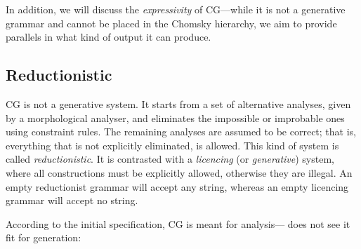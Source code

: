 In addition, we will discuss the \emph{expressivity} of CG---while it is not a generative grammar and cannot be placed in the Chomsky hierarchy, we aim to provide parallels in what kind of output it can produce.

\subsection{Reductionistic}\label{reductionist-vs.licencing}

CG is not a generative system.
It starts from a set of alternative analyses, given by a morphological analyser,
and eliminates the impossible or improbable ones using constraint rules. 
The remaining analyses are assumed to be correct; that
is, everything that is not explicitly eliminated, is allowed. 
This kind of system is called \emph{reductionistic}. It is contrasted 
with a \emph{licencing} (or \emph{generative}) system, where all constructions must
be explicitly allowed, otherwise they are illegal. 
An empty reductionist grammar will accept any string, whereas an empty
licencing grammar will accept no string.




According to the initial specification, CG is meant for analysis---\cite{karlsson1995constraint} does not see it fit for generation:

